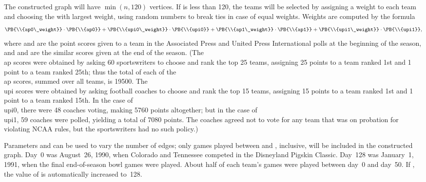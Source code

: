 The constructed graph will have $\min(n,120)$ vertices. If  is less
than 120, the  teams will be selected by assigning a weight to
each team and choosing the  with largest weight, using random
numbers to break ties in case of equal weights. Weights are computed
by the formula
$$ \PB{\\{ap0\_weight}}\cdot\PB{\\{ap0}}+\PB{\\{upi0\_weight}}\cdot\PB{%
\\{upi0}}
+\PB{\\{ap1\_weight}}\cdot\PB{\\{ap1}}+\PB{\\{upi1\_weight}}\cdot\PB{\\{upi1}},
$$
where  and  are the point scores given to a team in
the
Associated Press and United Press International polls at the beginning
of the season, and  and  are the similar scores given
at
the end of the season. (The \\{ap} scores were obtained by asking 60
sportswriters to choose and rank the top 25 teams, assigning 25 points
to a team ranked 1st and 1 point to a team ranked 25th; thus the
total of each of the \\{ap} scores, summed over all teams,
is 19500. The \\{upi} scores were
obtained by asking football coaches to choose and rank the top 15
teams, assigning 15 points to a team ranked 1st and 1 point to a team
ranked 15th. In the case of \\{upi0}, there were 48 coaches voting,
making 5760 points altogether; but in the case of \\{upi1}, 59 coaches
were polled, yielding a total of 7080 points. The coaches agreed not
to vote for any team that was on probation for violating NCAA rules,
but the sportswriters had no such policy.)

Parameters  and  can be used to vary the
number of
edges; only games played between  and ,
inclusive,
will be included in the constructed graph. Day~0 was August~26, 1990,
when Colorado and Tennessee competed in the Disneyland Pigskin Classic.
Day~128 was January~1, 1991, when the final end-of-season bowl games
were played. About half of each team's games were played between day~0 and
day~50. If , the value of  is
automatically
increased to~128.

